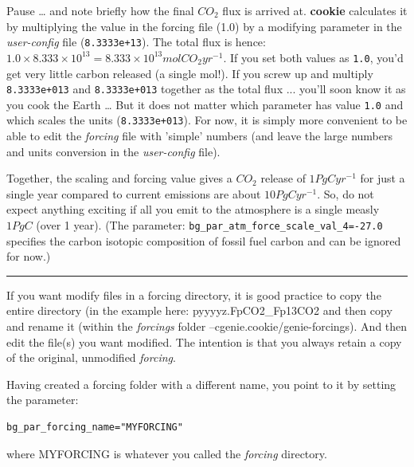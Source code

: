 Pause … and note briefly how the final \(CO_{2}\) flux is arrived at. \textbf{cookie} calculates it by multiplying the value in the forcing file (1.0) by a modifying parameter in the \textit{user-config} file (\texttt{8.3333e+13}). The total flux is hence: \(1.0 \times 8.333\times10^{13} = 8.333\times10^{13} mol CO_{2} yr^{-1}\). If you set both values as \texttt{1.0}, you’d get very little carbon released (a single mol!). If you screw up and multiply \texttt{8.3333e+013} and \texttt{8.3333e+013} together as the total flux ... you’ll soon know it as you cook the Earth … But it does not matter which parameter has value \texttt{1.0} and which scales the units (\texttt{8.3333e+013}). For now, it is simply more convenient to be able to edit the \textit{forcing} file with 'simple' numbers (and leave the large numbers and units conversion in the \textit{user-config} file).

Together, the scaling and forcing value gives a \(CO_{2}\) release of \(1 PgC yr^{-1}\) for just a single year compared to current emissions are about \(10 PgC yr^{-1}\). So, do not expect anything exciting if all you emit to the atmosphere is a single measly \(1 PgC\) (over 1 year). (The parameter: \texttt{\small bg\_par\_atm\_force\_scale\_val\_4=-27.0} specifies the carbon isotopic composition of fossil fuel carbon and can be ignored for now.)

\vspace{1mm} \noindent\rule{4cm}{0.1mm} \vspace{2mm}

\newpage

\noindent If you want modify files in a forcing directory, it is good practice to copy the entire directory (in the example here: \textsf{\footnotesize pyyyyz.FpCO2\_Fp13CO2} and then copy and rename it (within the \textit{forcings} folder --\textsf{\footnotesize cgenie.cookie/genie-forcings}). And then edit the file(s) you want modified. The intention is that you always retain a copy of the original, unmodified \textit{forcing}.

\vspace{1mm}
Having created a forcing folder with a different name, you point to it by setting the parameter:
\vspace{-2pt}\small\begin{verbatim}
bg_par_forcing_name="MYFORCING"
\end{verbatim}\normalsize\vspace{-2pt}
where \textsf{\footnotesize MYFORCING} is whatever you called the \textit{forcing} directory.

